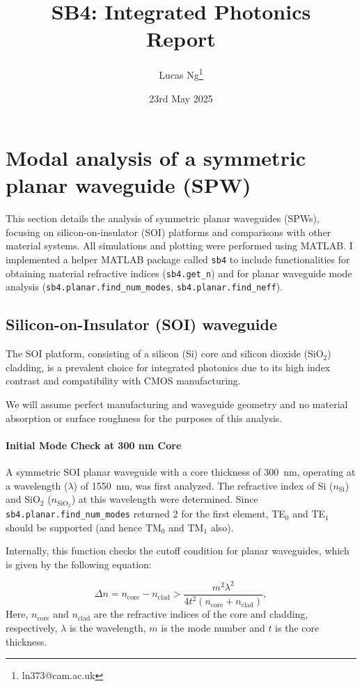 \documentclass[10pt, a4paper]{article}
\title{\Large \bfseries SB4: Integrated Photonics\\[0.5em] \large Report}
\author{Lucas Ng\thanks{ln373@cam.ac.uk}}
\date{23rd May 2025}
\begin{document}
\maketitle

\section{Modal analysis of a symmetric planar waveguide (SPW)}
This section details the analysis of symmetric planar waveguides (SPWs), focusing on silicon-on-insulator (SOI) platforms and comparisons with other material systems. All simulations and plotting were performed using MATLAB. I implemented a helper MATLAB package called \texttt{sb4} to include functionalities for obtaining material refractive indices (\texttt{sb4.get\_n}) and for planar waveguide mode analysis (\texttt{sb4.planar.find\_num\_modes}, \texttt{sb4.planar.find\_neff}).

\subsection{Silicon-on-Insulator (SOI) waveguide}
The SOI platform, consisting of a silicon (Si) core and silicon dioxide (SiO$_2$) cladding, is a prevalent choice for integrated photonics due to its high index contrast and compatibility with CMOS manufacturing.

We will assume perfect manufacturing and waveguide geometry and no material absorption or surface roughness for the purposes of this analysis. 

\paragraph{Initial Mode Check at 300 nm Core}
A symmetric SOI planar waveguide with a core thickness of 300~nm, operating at a wavelength ($\lambda$) of 1550~nm, was first analyzed. The refractive index of Si ($n_{\text{Si}}$) and SiO$_2$ ($n_{\text{SiO}_2}$) at this wavelength were determined. Since \texttt{sb4.planar.find\_num\_modes} returned 2 for the first element, TE$_0$ and TE$_1$ should be supported (and hence TM$_0$ and TM$_1$ also).

Internally, this function checks the cutoff condition for planar waveguides, which is given by the following equation:

\begin{equation}
    \Delta n = n_{\text{core}} - n_{\text{clad}} > \frac{m^2\lambda^2}{4t^2(n_{\text{core}}+ n_{\text{clad}})},
\end{equation}
Here, $n_{\text{core}}$ and $n_{\text{clad}}$ are the refractive indices of the core and cladding, respectively, $\lambda$ is the wavelength, $m$ is the mode number and $t$ is the core thickness.
\end{document}
